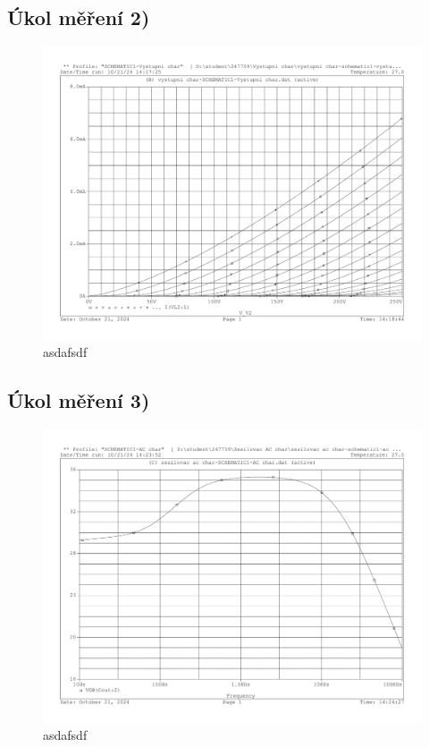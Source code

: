 \documentclass[a4paper, czech]{article}
\begin{document}
\subsection{Úkol měření 2)}

\begin{figure}[H]
    \centering
    \includegraphics[width=\textwidth]{charakteristiky/uloha2.pdf}
    \caption{asdafsdf}
\end{figure}

\subsection{Úkol měření 3)}

\begin{figure}[H]
    \centering
    \includegraphics[width=\textwidth]{charakteristiky/uloha3.pdf}
    \caption{asdafsdf}
\end{figure}
\end{document}

